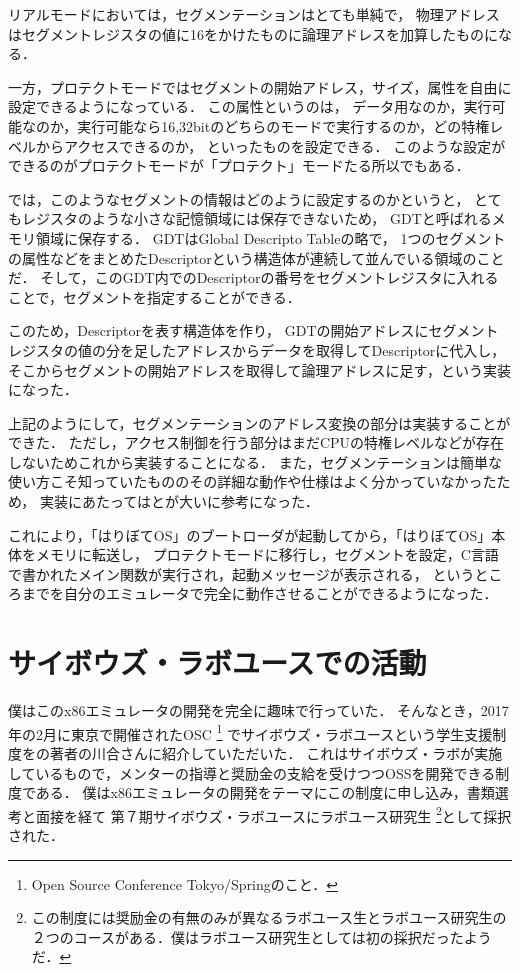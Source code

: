 \documentclass[10pt,a4j]{jsarticle}
\begin{document}
リアルモードにおいては，セグメンテーションはとても単純で，
物理アドレスはセグメントレジスタの値に16をかけたものに論理アドレスを加算したものになる．

一方，プロテクトモードではセグメントの開始アドレス，サイズ，属性を自由に設定できるようになっている．
この属性というのは，
データ用なのか，実行可能なのか，実行可能なら16,32bitのどちらのモードで実行するのか，どの特権レベルからアクセスできるのか，
といったものを設定できる．
このような設定ができるのがプロテクトモードが「プロテクト」モードたる所以でもある．

では，このようなセグメントの情報はどのように設定するのかというと，
とてもレジスタのような小さな記憶領域には保存できないため，
GDTと呼ばれるメモリ領域に保存する．
GDTはGlobal Descripto Tableの略で，
1つのセグメントの属性などをまとめたDescriptorという構造体が連続して並んでいる領域のことだ．
そして，このGDT内でのDescriptorの番号をセグメントレジスタに入れることで，セグメントを指定することができる．

このため，Descriptorを表す構造体を作り，
GDTの開始アドレスにセグメントレジスタの値の分を足したアドレスからデータを取得してDescriptorに代入し，
そこからセグメントの開始アドレスを取得して論理アドレスに足す，という実装になった．

上記のようにして，セグメンテーションのアドレス変換の部分は実装することができた．
ただし，アクセス制御を行う部分はまだCPUの特権レベルなどが存在しないためこれから実装することになる．
また，セグメンテーションは簡単な使い方こそ知っていたもののその詳細な動作や仕様はよく分かっていなかったため，
実装にあたっては\cite[はじめて読む486]{read-486}と\cite[SDM]{SDM}が大いに参考になった．

これにより，「はりぼてOS」のブートローダが起動してから，「はりぼてOS」本体をメモリに転送し，
プロテクトモードに移行し，セグメントを設定，C言語で書かれたメイン関数が実行され，起動メッセージが表示される，
というところまでを自分のエミュレータで完全に動作させることができるようになった．

\section{サイボウズ・ラボユースでの活動}

僕はこのx86エミュレータの開発を完全に趣味で行っていた．
そんなとき，2017年の2月に東京で開催されたOSC
\footnote{Open Source Conference Tokyo/Springのこと．}
でサイボウズ・ラボユースという学生支援制度を\cite{30days-osdev}の著者の川合さんに紹介していただいた．
これはサイボウズ・ラボが実施しているもので，メンターの指導と奨励金の支給を受けつつOSSを開発できる制度である．
僕はx86エミュレータの開発をテーマにこの制度に申し込み，書類選考と面接を経て
第７期サイボウズ・ラボユースにラボユース研究生
\footnote{この制度には奨励金の有無のみが異なるラボユース生とラボユース研究生の２つのコースがある．僕はラボユース研究生としては初の採択だったようだ．}として採択された．
\end{document}
